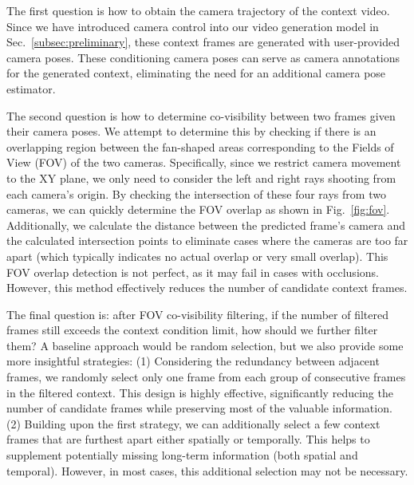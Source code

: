The first question is how to obtain the camera trajectory of the context video. Since we have introduced camera control into our video generation model in Sec.~\ref{subsec:preliminary}, these context frames are generated with user-provided camera poses. These conditioning camera poses can serve as camera annotations for the generated context, eliminating the need for an additional camera pose estimator.


The second question is how to determine co-visibility between two frames given their camera poses. We attempt to determine this by checking if there is an overlapping region between the fan-shaped areas corresponding to the Fields of View (FOV) of the two cameras. Specifically, since we restrict camera movement to the XY plane, we only need to consider the left and right rays shooting from each camera's origin. By checking the intersection of these four rays from two cameras, we can quickly determine the FOV overlap as shown in Fig.~\ref{fig:fov}. Additionally, we calculate the distance between the predicted frame's camera and the calculated intersection points to eliminate cases where the cameras are too far apart (which typically indicates no actual overlap or very small overlap). This FOV overlap detection is not perfect, as it may fail in cases with occlusions. However, this method effectively reduces the number of candidate context frames.

The final question is: after FOV co-visibility filtering, if the number of filtered frames still exceeds the context condition limit, how should we further filter them? A baseline approach would be random selection, but we also provide some more insightful strategies:
(1) Considering the redundancy between adjacent frames, we randomly select only one frame from each group of consecutive frames in the filtered context. This design is highly effective, significantly reducing the number of candidate frames while preserving most of the valuable information.
(2) Building upon the first strategy, we can additionally select a few context frames that are furthest apart either spatially or temporally. This helps to supplement potentially missing long-term information (both spatial and temporal). However, in most cases, this additional selection may not be necessary.



